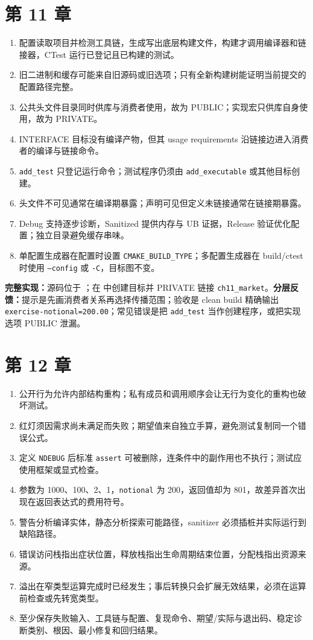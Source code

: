 \section{第 11 章}
\begin{enumerate}
  \item 配置读取项目并检测工具链，生成写出底层构建文件，构建才调用编译器和链接器，CTest 运行已登记且已构建的测试。
  \item 旧二进制和缓存可能来自旧源码或旧选项；只有全新构建树能证明当前提交的配置路径完整。
  \item 公共头文件目录同时供库与消费者使用，故为 PUBLIC；实现宏只供库自身使用，故为 PRIVATE。
  \item INTERFACE 目标没有编译产物，但其 usage requirements 沿链接边进入消费者的编译与链接命令。
  \item \texttt{add\_test} 只登记运行命令；测试程序仍须由 \texttt{add\_executable} 或其他目标创建。
  \item 头文件不可见通常在编译期暴露；声明可见但定义未链接通常在链接期暴露。
  \item Debug 支持逐步诊断，Sanitized 提供内存与 UB 证据，Release 验证优化配置；独立目录避免缓存串味。
  \item 单配置生成器在配置时设置 \texttt{CMAKE\_BUILD\_TYPE}；多配置生成器在 build/ctest 时使用 \texttt{--config} 或 \texttt{-C}，目标图不变。
\end{enumerate}

\noindent\textbf{完整实现：}源码位于 ；在  中创建目标并 PRIVATE 链接 \texttt{ch11\_market}。\textbf{分层反馈：}提示是先画消费者关系再选择传播范围；验收是 clean build 精确输出 \texttt{exercise-notional=200.00}；常见错误是把 \texttt{add\_test} 当作创建程序，或把实现选项 PUBLIC 泄漏。

\section{第 12 章}
\begin{enumerate}
  \item 公开行为允许内部结构重构；私有成员和调用顺序会让无行为变化的重构也破坏测试。
  \item 红灯须因需求尚未满足而失败；期望值来自独立手算，避免测试复制同一个错误公式。
  \item 定义 \texttt{NDEBUG} 后标准 \texttt{assert} 可被删除，连条件中的副作用也不执行；测试应使用框架或显式检查。
  \item 参数为 1000、100、2、1，\texttt{notional} 为 200，返回值却为 801，故差异首次出现在返回表达式的费用符号。
  \item 警告分析编译实体，静态分析探索可能路径，sanitizer 必须插桩并实际运行到缺陷路径。
  \item 错误访问栈指出症状位置，释放栈指出生命周期结束位置，分配栈指出资源来源。
  \item 溢出在窄类型运算完成时已经发生；事后转换只会扩展无效结果，必须在运算前检查或先转宽类型。
  \item 至少保存失败输入、工具链与配置、复现命令、期望/实际与退出码、稳定诊断类别、根因、最小修复和回归结果。
\end{enumerate}

